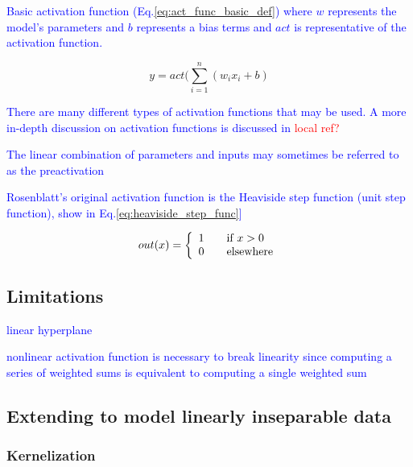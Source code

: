 \textcolor{blue}{Basic activation function (Eq.\ref{eq:act_func_basic_def}) where $w$ represents the model's parameters and $b$ represents a bias terms and $act$ is representative of the activation function.}

\begin{equation}
{y = act (\sum_{i=1}^{n}(w_i x_i + b)}
\label{eq:act_func_basic_def}
\end{equation}

\textcolor{blue}{There are many different types of activation functions that may be used. A more in-depth discussion on activation functions is discussed in \textcolor{red}{local ref?}}

\textcolor{blue}{The linear combination of parameters and inputs may sometimes be referred to as the preactivation}

\textcolor{blue}{Rosenblatt's original activation function is the {Heaviside step function} ({unit step function}), show in Eq.\ref{eq:heaviside_step_func}]}

\begin{equation}
{out(x) = \left\{
	\begin{array}{ll}
	1 & \quad $if $ x > 0 \\
	0 & \quad $elsewhere$
	\end{array}
	\right.}
\label{eq:heaviside_step_func}
\end{equation}



\subsection{Limitations}

\textcolor{blue}{linear hyperplane}

\textcolor{blue}{nonlinear activation function is necessary to break linearity since computing a series of weighted sums is equivalent to computing a single weighted sum}

\subsection{Extending to model linearly inseparable data}

\subsubsection{Kernelization}

